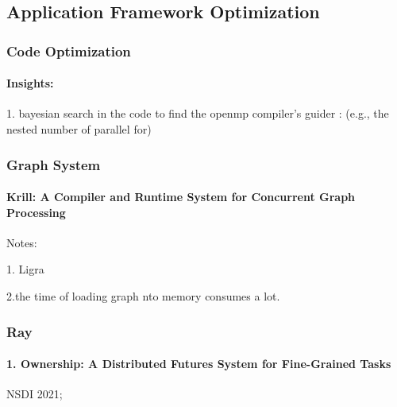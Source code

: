 \documentclass[UTF8]{article}
\begin{document}
\subsection{Application Framework Optimization}
\subsubsection{Code Optimization}
\paragraph{Insights:}
1. bayesian search in the code to find the openmp compiler's guider : (e.g., the nested number of parallel for)
\subsubsection{Graph System}
\paragraph{Krill: A Compiler and Runtime System for Concurrent Graph Processing}
Notes:

1. Ligra 

2.the time of loading graph nto memory consumes a lot. 

\subsubsection{Ray}
\paragraph{1. Ownership: A Distributed Futures System for Fine-Grained Tasks~\cite{wang2021ownership}}
NSDI 2021; 
\end{document}
